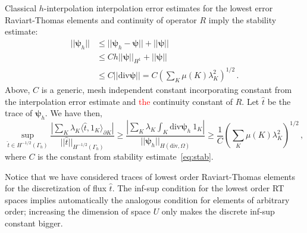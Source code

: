 \documentclass[letterpaper]{article}
\newcommand{\ptl}{{\partial}}
\newcommand{\bfpsi}{\boldsymbol\psi}
\newcommand{\red}[1]{\textcolor{red}{#1}}
\begin{document}
Classical $h$-interpolation interpolation error estimates for the lowest error
Raviart-Thomas elements and continuity of operator $R$ imply the stability estimate:
\begin{equation}
\begin{array}{lll}
|| \bfpsi_h || & \leq || \bfpsi_h - \bfpsi || + || \bfpsi ||\\[8pt]
&\leq C h || \bfpsi ||_{H^1} +  || \bfpsi || \\[8pt]
& \leq C || \text{div} \bfpsi || = C (\sum_K \mu(K) \lambda_K^2)^{1/2}\,.
\end{array}
\label{eq:stab}
\end{equation}
Above, $C$ is a generic, mesh independent constant incorporating constant from
the interpolation error estimate and \red{the} continuity constant of $R$.
Let $\hat{t}$ be the trace of $\bfpsi_h$. We have then,
\begin{equation}
\sup_{\hat{t} \in H^{-1/2}(\Gamma_h)} \frac{|  \sum_K \lambda_K \langle
\hat{t},1_K \rangle_{\ptl K} |}{|| \hat{t} ||_{H^{-1/2}(\Gamma_h)}}
\geq \frac{| \sum_K \lambda_K \int_K \text{div} \bfpsi_h \: 1_K  |}
{|| \bfpsi_h ||_{H(\text{div},\Omega)}}
\geq \frac{1}{C} (\sum_K \mu(K) \lambda_K^2)^{1/2}\,,
\end{equation}
where $C$ is the constant from stability estimate~\eqref{eq:stab}.

Notice that we have considered traces of lowest order Raviart-Thomas elements
for the discretization of flux $\hat{t}$. The inf-sup condition for the lowest
order RT spaces implies automatically the analogous condition for elements of
arbitrary order; increasing the dimension of space $U$ only makes the discrete
inf-sup constant bigger.
\end{document}

